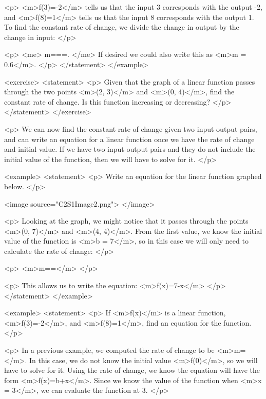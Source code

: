             <p>
                <m>f(3)=-2</m> tells us that the input 3 corresponds with the output -2, and <m>f(8)=1</m> tells us that the input 8 corresponds with the output 1. To find the constant rate of change, we divide the change in output by the change in input:
            </p>

            <p>
                <me>
                    m===.
                </me>
                If desired we could also write this as <m>m = 0.6</m>.
            </p>
        </statement>
    </example>

    <exercise>
        <statement>
            <p>
                Given that the graph of a linear function passes through the two points <m>(2, 3)</m> and <m>(0, 4)</m>, find the constant rate of change.
                Is this function increasing or decreasing?
            </p>
        </statement>
    </exercise>

    <p>
        We can now find the constant rate of change given two input-output pairs, and can write an equation for a linear function once we have the rate of change and initial value.
        If we have two input-output pairs and they do not include the initial value of the function, then we will have to solve for it.
    </p>

    <example>
        <statement>
            <p>
                Write an equation for the linear function graphed below.
            </p>

            <image source="C2S1Image2.png">
            </image>

            <p>
                Looking at the graph, we might notice that it passes through the points <m>(0, 7)</m> and <m>(4, 4)</m>.
                From the first value, we know the initial value of the function is <m>b = 7</m>, so in this case we will only need to calculate the rate of change:
            </p>

            <p>
                <m>m==</m>
            </p>

            <p>
                This allows us to write the equation: <m>f(x)=7-x</m>
            </p>
        </statement>
    </example>

    <example>
        <statement>
            <p>
                If <m>f(x)</m> is a linear function, <m>f(3)=-2</m>, and <m>f(8)=1</m>, find an equation for the function.
            </p>

            <p>
                In a previous example, we computed the rate of change to be <m>m=</m>.
                In this case, we do not know the initial value <m>f(0)</m>, so we will have to solve for it.
                Using the rate of change, we know the equation will have the form <m>f(x)=b+x</m>.
                Since we know the value of the function when <m>x = 3</m>, we can evaluate the function at 3.
            </p>

